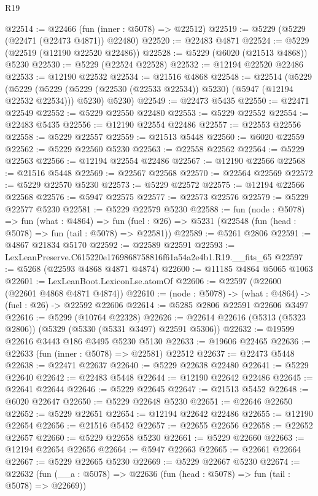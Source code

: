 \begin{lexlean}{R19}
\begin{coremodule}
@22514 := @22466 (fun (inner : @5078) => @22512)
@22519 := @5229 (@5229 (@22471 (@22473 @4871)) @22480)
@22520 := @22483 @4871
@22524 := @5229 (@22519 (@12190 @22520 @22486))
@22528 := @5229 (@6020 (@21513 @4868)) @5230
@22530 := @5229 (@22524 @22528)
@22532 := @12194 @22520 @22486
@22533 := @12190 @22532
@22534 := @21516 @4868
@22548 := @22514
    (@5229
      (@5229 (@5229 (@5229 (@22530 (@22533 @22534)) @5230) (@5947 (@12194 @22532 @22534))) @5230)
      @5230)
@22549 := @22473 @5435
@22550 := @22471 @22549
@22552 := @5229 @22550 @22480
@22553 := @5229 @22552
@22554 := @22483 @5435
@22556 := @12190 @22554 @22486
@22557 := @22553 @22556
@22558 := @5229 @22557
@22559 := @21513 @5448
@22560 := @6020 @22559
@22562 := @5229 @22560 @5230
@22563 := @22558 @22562
@22564 := @5229 @22563
@22566 := @12194 @22554 @22486
@22567 := @12190 @22566
@22568 := @21516 @5448
@22569 := @22567 @22568
@22570 := @22564 @22569
@22572 := @5229 @22570 @5230
@22573 := @5229 @22572
@22575 := @12194 @22566 @22568
@22576 := @5947 @22575
@22577 := @22573 @22576
@22579 := @5229 @22577 @5230
@22581 := @5229 @22579 @5230
@22588 := fun (node : @5078) =>
  fun (what : @4864) =>
  fun (fuel : @26) => @5231 (@22548 (fun (head : @5078) => fun (tail : @5078) => @22581))
@22589 := @5261 @2806
@22591 := @4867 @21834 @5170
@22592 := @22589 @22591
@22593 := LexLeanPreserve.C615220e1769868758816f61a54a2e4b1.R19.__fits_65
@22597 := @5268 (@22593 @4868 @4871 @4874)
@22600 := @11185 @4864 @5065 @1063
@22601 := LexLeanBoot.LexiconLse.atomOf
@22606 := @22597 (@22600 (@22601 @4868 @4871 @4874))
@22610 := (node : @5078) -> (what : @4864) -> (fuel : @26) -> @22592 @22606
@22614 := @5285 @2806 @22591 @22606 @3497
@22616 := @5299 (@10764 @22328)
@22626 := @22614 @22616 (@5313 (@5323 @2806)) (@5329 (@5330 (@5331 @3497) @22591 @5306))
@22632 := @19599 @22616 @3443 @186 @3495 @5230 @5130
@22633 := @19606 @22465
@22636 := @22633 (fun (inner : @5078) => @22581) @22512
@22637 := @22473 @5448
@22638 := @22471 @22637
@22640 := @5229 @22638 @22480
@22641 := @5229 @22640
@22642 := @22483 @5448
@22644 := @12190 @22642 @22486
@22645 := @22641 @22644
@22646 := @5229 @22645
@22647 := @21513 @5452
@22648 := @6020 @22647
@22650 := @5229 @22648 @5230
@22651 := @22646 @22650
@22652 := @5229 @22651
@22654 := @12194 @22642 @22486
@22655 := @12190 @22654
@22656 := @21516 @5452
@22657 := @22655 @22656
@22658 := @22652 @22657
@22660 := @5229 @22658 @5230
@22661 := @5229 @22660
@22663 := @12194 @22654 @22656
@22664 := @5947 @22663
@22665 := @22661 @22664
@22667 := @5229 @22665 @5230
@22669 := @5229 @22667 @5230
@22674 := @22632 (fun (__a : @5078) => @22636 (fun (head : @5078) => fun (tail : @5078) => @22669))

\end{coremodule}
\end{lexlean}

